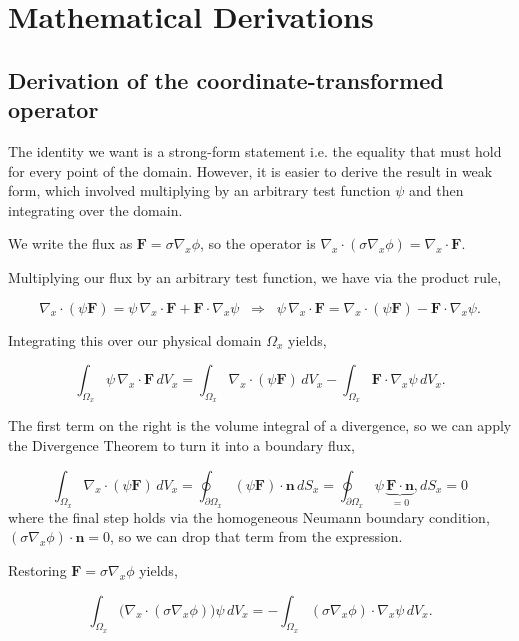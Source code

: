\documentclass[final-report]{report-template}
\begin{document}
\appendix

\section{Mathematical Derivations}
\label{app:derivations}

\subsection{Derivation of the coordinate-transformed operator}
\label{sec:strong-form-derivation}

The identity we want is a strong-form statement i.e. the equality that must hold for every point of the domain. However, it is easier to derive the result in weak form, which involved multiplying by an arbitrary test function $\psi$ and then integrating over the domain.

We write the flux as $\mathbf F=\sigma\nabla_x\phi$, so the operator is $\nabla_x\!\cdot(\sigma\nabla_x\phi)=\nabla_x\!\cdot\mathbf F$.

Multiplying our flux by an arbitrary test function, we have via the product rule,

$$
\nabla_x\!\cdot(\psi\mathbf F)=\psi\,\nabla_x\!\cdot\mathbf F+\mathbf F\cdot\nabla_x\psi
\;\;\Longrightarrow\;\;
\psi\,\nabla_x\!\cdot\mathbf F=\nabla_x\!\cdot(\psi\mathbf F)-\mathbf F\cdot\nabla_x\psi .
$$

Integrating this over our physical domain $\Omega_x$ yields,

$$
\int_{\Omega_x}\!\psi\,\nabla_x\!\cdot\mathbf F\,dV_x
=\int_{\Omega_x}\!\nabla_x\!\cdot(\psi\mathbf F)\,dV_x
-\int_{\Omega_x}\!\mathbf F\cdot\nabla_x\psi\,dV_x .
$$

The first term on the right is the volume integral of a divergence, so we can apply the Divergence Theorem to turn it into a boundary flux,

$$
\int_{\Omega_x}\!\nabla_x\!\cdot(\psi\mathbf F)\,dV_x
=\oint_{\partial\Omega_x}\!(\psi\mathbf F)\cdot\mathbf n\,dS_x
=\oint_{\partial\Omega_x}\!\psi\, \underbrace{\mathbf F\cdot\mathbf n}_{=0},dS_x
=0
$$
where the final step holds via the homogeneous Neumann boundary condition, $(\sigma\nabla_x\phi)\cdot\mathbf n=0$, so we can drop that term from the expression.

Restoring $\mathbf F=\sigma\nabla_x\phi$ yields,

$$
\int_{\Omega_x}\!\big(\nabla_x\!\cdot(\sigma\nabla_x\phi)\big)\psi\,dV_x
= -\int_{\Omega_x}\!(\sigma\nabla_x\phi)\cdot\nabla_x\psi\,dV_x .
$$
\end{document}
